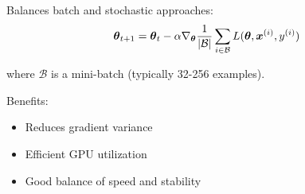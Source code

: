 Balances batch and stochastic approaches:
\begin{equation}
\boldsymbol{\theta}_{t+1} = \boldsymbol{\theta}_t - \alpha \nabla_{\boldsymbol{\theta}} \frac{1}{|\mathcal{B}|} \sum_{i \in \mathcal{B}} L(\boldsymbol{\theta}, \boldsymbol{x}^{(i)}, y^{(i)})
\end{equation}

where $\mathcal{B}$ is a mini-batch (typically 32-256 examples).

Benefits:
\begin{itemize}
    \item Reduces gradient variance
    \item Efficient GPU utilization
    \item Good balance of speed and stability
\end{itemize}


